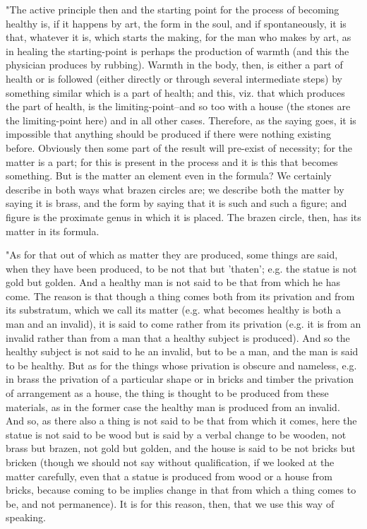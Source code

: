 "The active principle then and the starting point for the process
of becoming healthy is, if it happens by art, the form in the soul,
and if spontaneously, it is that, whatever it is, which starts the
making, for the man who makes by art, as in healing the starting-point
is perhaps the production of warmth (and this the physician produces
by rubbing). Warmth in the body, then, is either a part of health
or is followed (either directly or through several intermediate steps)
by something similar which is a part of health; and this, viz. that
which produces the part of health, is the limiting-point--and so too
with a house (the stones are the limiting-point here) and in all other
cases. Therefore, as the saying goes, it is impossible that anything
should be produced if there were nothing existing before. Obviously
then some part of the result will pre-exist of necessity; for the
matter is a part; for this is present in the process and it is this
that becomes something. But is the matter an element even in the formula?
We certainly describe in both ways what brazen circles are; we describe
both the matter by saying it is brass, and the form by saying that
it is such and such a figure; and figure is the proximate genus in
which it is placed. The brazen circle, then, has its matter in its
formula. 

"As for that out of which as matter they are produced, some things
are said, when they have been produced, to be not that but 'thaten';
e.g. the statue is not gold but golden. And a healthy man is not said
to be that from which he has come. The reason is that though a thing
comes both from its privation and from its substratum, which we call
its matter (e.g. what becomes healthy is both a man and an invalid),
it is said to come rather from its privation (e.g. it is from an invalid
rather than from a man that a healthy subject is produced). And so
the healthy subject is not said to he an invalid, but to be a man,
and the man is said to be healthy. But as for the things whose privation
is obscure and nameless, e.g. in brass the privation of a particular
shape or in bricks and timber the privation of arrangement as a house,
the thing is thought to be produced from these materials, as in the
former case the healthy man is produced from an invalid. And so, as
there also a thing is not said to be that from which it comes, here
the statue is not said to be wood but is said by a verbal change to
be wooden, not brass but brazen, not gold but golden, and the house
is said to be not bricks but bricken (though we should not say without
qualification, if we looked at the matter carefully, even that a statue
is produced from wood or a house from bricks, because coming to be
implies change in that from which a thing comes to be, and not permanence).
It is for this reason, then, that we use this way of speaking.

